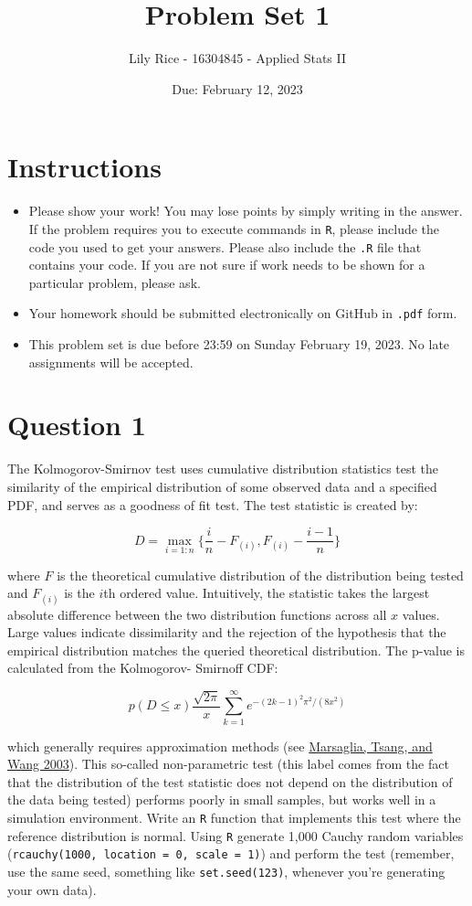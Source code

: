 \documentclass[12pt,letterpaper]{article}
\title{Problem Set 1}
\date{Due: February 12, 2023}
\author{Lily Rice - 16304845 - Applied Stats II}
\begin{document}
	\maketitle
	\section*{Instructions}
	\begin{itemize}
	\item Please show your work! You may lose points by simply writing in the answer. If the problem requires you to execute commands in \texttt{R}, please include the code you used to get your answers. Please also include the \texttt{.R} file that contains your code. If you are not sure if work needs to be shown for a particular problem, please ask.
\item Your homework should be submitted electronically on GitHub in \texttt{.pdf} form.
\item This problem set is due before 23:59 on Sunday February 19, 2023. No late assignments will be accepted.
	\end{itemize}

	\vspace{.25cm}
\section*{Question 1} 
\vspace{.25cm}
\noindent The Kolmogorov-Smirnov test uses cumulative distribution statistics test the similarity of the empirical distribution of some observed data and a specified PDF, and serves as a goodness of fit test. The test statistic is created by:

$$D = \max_{i=1:n} \Big\{ \frac{i}{n}  - F_{(i)}, F_{(i)} - \frac{i-1}{n} \Big\}$$

\noindent where $F$ is the theoretical cumulative distribution of the distribution being tested and $F_{(i)}$ is the $i$th ordered value. Intuitively, the statistic takes the largest absolute difference between the two distribution functions across all $x$ values. Large values indicate dissimilarity and the rejection of the hypothesis that the empirical distribution matches the queried theoretical distribution. The p-value is calculated from the Kolmogorov-
Smirnoff CDF:

$$p(D \leq x) \frac{\sqrt {2\pi}}{x} \sum _{k=1}^{\infty }e^{-(2k-1)^{2}\pi ^{2}/(8x^{2})}$$


\noindent which generally requires approximation methods (see \href{https://core.ac.uk/download/pdf/25787785.pdf}{Marsaglia, Tsang, and Wang 2003}). This so-called non-parametric test (this label comes from the fact that the distribution of the test statistic does not depend on the distribution of the data being tested) performs poorly in small samples, but works well in a simulation environment. Write an \texttt{R} function that implements this test where the reference distribution is normal. Using \texttt{R} generate 1,000 Cauchy random variables (\texttt{rcauchy(1000, location = 0, scale = 1)}) and perform the test (remember, use the same seed, something like \texttt{set.seed(123)}, whenever you're generating your own data).\\
	
\end{document}

